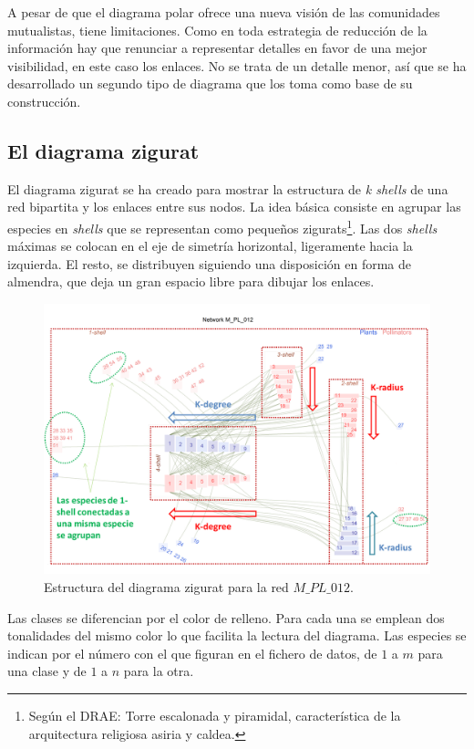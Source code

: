 A pesar de que el diagrama polar ofrece una nueva visión de las comunidades mutualistas, tiene limitaciones. Como en toda estrategia de reducción de la información hay que renunciar a representar detalles en favor de una mejor visibilidad, en este caso los enlaces. No se trata de un detalle menor, así que se ha desarrollado un segundo tipo de diagrama que los toma como base de su construcción.

\clearpage
\subsection{El diagrama zigurat}
\label{sec:diagrama_zigurat}

El diagrama zigurat se ha creado para mostrar la estructura de \textit{k shells} de una red bipartita y los enlaces entre sus nodos. La idea básica consiste en agrupar las especies en \textit{shells} que se representan como pequeños zigurats\footnote{Según el DRAE: Torre escalonada y piramidal, característica de la arquitectura religiosa asiria y caldea.}. Las dos \textit{shells} máximas se colocan en el eje de simetría horizontal, ligeramente hacia la izquierda. El resto, se distribuyen siguiendo una disposición en forma de almendra, que deja un gran espacio libre para dibujar los enlaces.

\begin{figure}[h!]
\centering
\includegraphics[scale=0.4]{Figures/VIS_explicacion_zigurat.png}
\caption {Estructura del diagrama zigurat para la red  $M\_PL\_012$.}
\label{fig:VIS_explicacion_zigurat}
\end{figure}

Las clases se diferencian por el color de relleno. Para cada una se emplean dos tonalidades del mismo color lo que facilita la lectura del diagrama. Las especies se indican por el número
con el que figuran en el fichero de datos, de $1$ a $m$ para una clase y de $1$ a $n$ para la otra.

